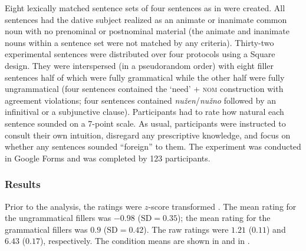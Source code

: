 \documentclass[output=paper]{langscibook}
\begin{document}
Eight lexically matched sentence sets of four sentences as in  were created. All sentences had the dative subject realized as an animate or inanimate common noun with no prenominal or postnominal material (the animate and inanimate nouns within a sentence set were not matched by any criteria). Thirty-two experimental sentences were distributed over four protocols using a  Square design. They were interspersed (in a pseudorandom order) with eight filler sentences half of which were fully grammatical while the other half were fully ungrammatical (four sentences contained the `need' + \textsc{nom} construction with agreement violations; four sentences contained \textit{nužen}/\textit{nužno} followed by an infinitival or a subjunctive clause). Participants had to rate how natural each sentence sounded on a 7-point scale. As usual, participants were instructed to consult their own intuition, disregard any prescriptive knowledge, and focus on whether any sentences sounded ``foreign'' to them. The experiment was conducted in Google Forms and was completed by 123 participants.

\subsubsection{Results}

Prior to the analysis, the ratings were $z$-score transformed \citep[see][]{Schuetze.Sprouse2014}. The mean rating for the ungrammatical fillers was $-0.98$ ($\text{SD}=0.35$); the mean rating for the grammatical fillers was $0.9$ ($\text{SD} =0.42$). The raw ratings were $1.21$ ($0.11$) and $6.43$ ($0.17$), respectively. The condition means are shown in  and in .

\end{document}
